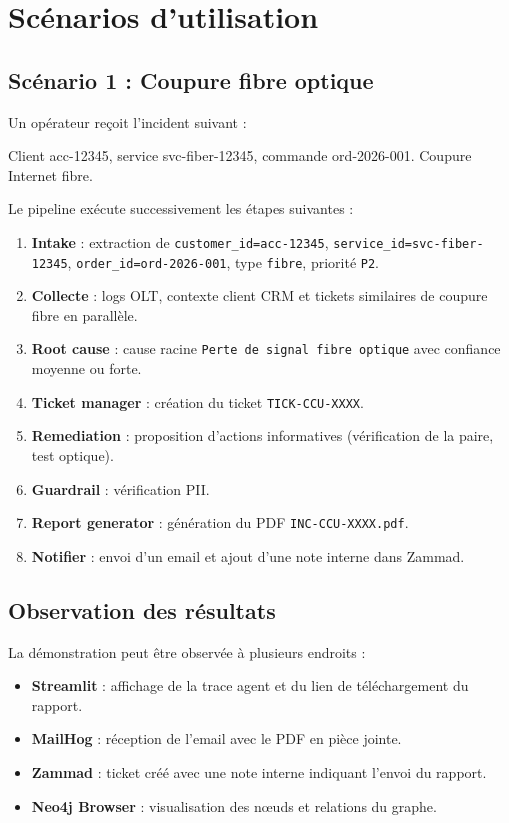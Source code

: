 \section{Scénarios d'utilisation}

\subsection{Scénario 1 : Coupure fibre optique}
Un opérateur reçoit l'incident suivant :

\begin{fquote}
Client acc-12345, service svc-fiber-12345, commande ord-2026-001. Coupure Internet fibre.
\end{fquote}

Le pipeline exécute successivement les étapes suivantes :

\begin{enumerate}
    \item \textbf{Intake} : extraction de \texttt{customer\_id=acc-12345}, \texttt{service\_id=svc-fiber-12345}, \texttt{order\_id=ord-2026-001}, type \texttt{fibre}, priorité \texttt{P2}.
    \item \textbf{Collecte} : logs OLT, contexte client CRM et tickets similaires de coupure fibre en parallèle.
    \item \textbf{Root cause} : cause racine \texttt{Perte de signal fibre optique} avec confiance moyenne ou forte.
    \item \textbf{Ticket manager} : création du ticket \texttt{TICK-CCU-XXXX}.
    \item \textbf{Remediation} : proposition d'actions informatives (vérification de la paire, test optique).
    \item \textbf{Guardrail} : vérification PII.
    \item \textbf{Report generator} : génération du PDF \texttt{INC-CCU-XXXX.pdf}.
    \item \textbf{Notifier} : envoi d'un email et ajout d'une note interne dans Zammad.
\end{enumerate}

\subsection{Observation des résultats}
La démonstration peut être observée à plusieurs endroits :

\begin{itemize}
    \setlength\itemsep{0.1em}
    \setlength\parskip{0pt}
    \setlength\parsep{0pt}
    \item \textbf{Streamlit} : affichage de la trace agent et du lien de téléchargement du rapport.
    \item \textbf{MailHog} : réception de l'email avec le PDF en pièce jointe.
    \item \textbf{Zammad} : ticket créé avec une note interne indiquant l'envoi du rapport.
    \item \textbf{Neo4j Browser} : visualisation des nœuds et relations du graphe.
\end{itemize}

